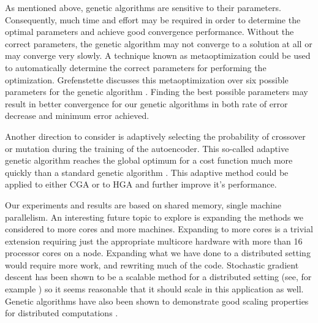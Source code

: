 As mentioned above, genetic algorithms are sensitive to their parameters. Consequently, much time and effort may be required in order to determine the optimal parameters and achieve good convergence performance. Without the correct parameters, the genetic algorithm may not converge to a solution at all or may converge very slowly. A technique known as metaoptimization could be used to automatically determine the correct parameters for performing the optimization. Grefenstette discusses this metaoptimization over six possible parameters for the genetic algorithm \cite{metaoptimization}. Finding the best possible parameters may result in better convergence for our genetic algorithms in both rate of error decrease and minimum error achieved.

Another direction to consider is adaptively selecting the probability of crossover or mutation during the training of the autoencoder. This so-called adaptive genetic algorithm reaches the global optimum for a cost function much more quickly than a standard genetic algorithm \cite{srinivas94adaptive}. This adaptive method could be applied to either CGA or to HGA and further improve it's performance.

Our experiments and results are based on shared memory, single machine parallelism. An interesting future topic to explore is expanding the methods we considered to more cores and more machines. Expanding to more cores is a trivial extension requiring just the appropriate multicore hardware with more than 16 processor cores on a node. Expanding what we have done to a distributed setting would require more work, and rewriting much of the code. Stochastic gradient descent has been shown to be a scalable method for a distributed setting (see, for example \cite{zinkevich2010psgd}) so it seems reasonable that it should scale in this application as well. Genetic algorithms have also been shown to demonstrate good scaling properties for distributed computations \cite{Belding95thedistributed}.
